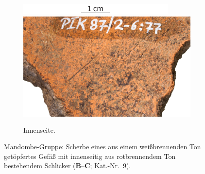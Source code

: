 \begin{figure}[!tb]
\begin{subfigure}[t]{.32\textwidth}
	\end{subfigure}\hfill
	\begin{subfigure}[t]{.32\textwidth}
		\centering
		\includegraphics[width = \textwidth, page = 1]{tbl/Tab_Fabrics/x_fabrics_scales.pdf}
		\includegraphics[width = \textwidth]{tbl/Tab_Fabrics/PIK87-2-6-77_inner_5cm.jpg}
		\caption{Innenseite.}
		\label{fig:PIK87-2-6-77_innen}
	\end{subfigure} %
	\caption{Mandombe-Gruppe: Scherbe eines aus einem weißbrennenden Ton getöpfertes Gefäß mit innenseitig aus rotbrennendem Ton bestehendem Schlicker (\textbf{B}--\textbf{C}; Kat.-Nr.~9).}
	\label{fig:PIK87-2-6-77}
\end{figure}

